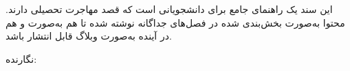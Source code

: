 \begin{titlepage}
  \centering
  \vspace*{1.5cm}

  {\Huge\bfseries\color{ApplyWayPrimary} \GuideTitle\par}
  \vspace{0.8cm}
  {\LARGE \GuideSubtitle\par}

  \vspace{2cm}

  \begin{infobox}[title={درباره این راهنما}]
    این سند یک راهنمای جامع برای دانشجویانی است که قصد مهاجرت تحصیلی دارند.
    محتوا به‌صورت بخش‌بندی شده در فصل‌های جداگانه نوشته شده تا هم به‌صورت 
    و هم در آینده به‌صورت وبلاگ قابل انتشار باشد.
  \end{infobox}

  \vfill

  {\large نگارنده: \GuideAuthor\par}
  \vspace{0.5cm}
  \vspace{1.5cm}
  {\small {}}
\end{titlepage}
